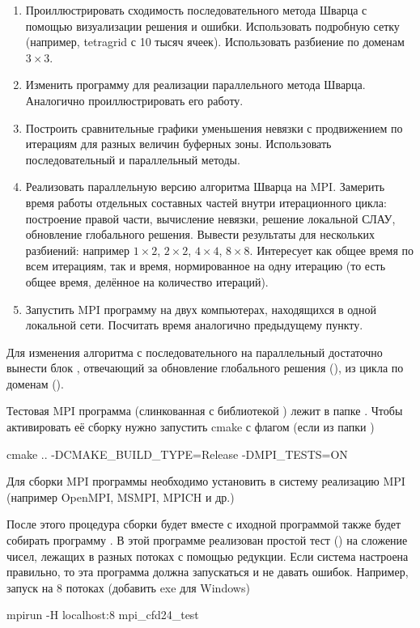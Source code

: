 \begin{enumerate}
\item Проиллюстрировать сходимость последовательного метода Шварца с помощью визуализации решения и ошибки. Использовать подробную сетку (например, tetragrid с 10 тысяч ячеек).
      Использовать разбиение по доменам $3\times3$.
\item Изменить программу для реализации параллельного метода Шварца. Аналогично проиллюстрировать его работу.
\item Построить сравнительные графики уменьшения невязки с продвижением по итерациям для разных величин буферных зоны. Использовать последовательный и параллельный методы.
\item Реализовать параллельную версию алгоритма Шварца на MPI. Замерить время работы отдельных составных частей внутри итерационного цикла: построение правой части, вычисление невязки, решение локальной СЛАУ, обновление глобального решения. Вывести результаты для нескольких разбиений: например $1\times2$, $2\times2$, $4\times4$, $8\times8$. Интересует как общее время по всем итерациям, так и время, нормированное на одну итерацию (то есть общее время, делённое на количество итераций).
\item Запустить MPI программу на двух компьютерах, находящихся в одной локальной сети. Посчитать время аналогично предыдущему пункту.
\end{enumerate}

Для изменения алгоритма с последовательного на параллельный достаточно вынести блок , отвечающий за обновление глобального решения (),
из цикла по доменам ().

Тестовая MPI программа (слинкованная с библиотекой ) лежит в папке .
Чтобы активировать её сборку нужно запустить cmake с флагом (если из папки )
\begin{cppcode}
cmake .. -DCMAKE_BUILD_TYPE=Release -DMPI_TESTS=ON
\end{cppcode}
Для сборки MPI программы необходимо установить в систему реализацию MPI (например OpenMPI, MSMPI, MPICH и др.)

После этого процедура сборки будет вместе с иходной программой  также будет собирать программу .
В этой программе реализован простой тест () на сложение чисел, лежащих в разных потоках с помощью редукции.
Если система настроена правильно, то эта программа должна запускаться и не давать ошибок. Например, запуск на 8 потоках (добавить exe для Windows)
\begin{cppcode}
mpirun -H localhost:8 mpi_cfd24_test 
\end{cppcode}

